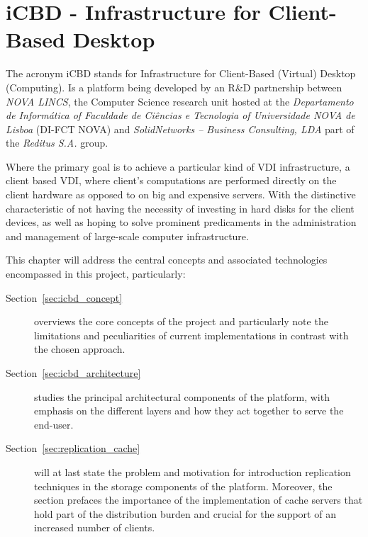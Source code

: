 

\chapter{iCBD - Infrastructure for Client-Based Desktop}
\label{cha:icbd}

The acronym \gls{iCBD} stands for Infrastructure for Client-Based (Virtual) Desktop (Computing). Is a platform being developed by an R\&D partnership between \textit{NOVA LINCS}, the Computer Science research unit hosted at the \textit{Departamento de Informática of Faculdade de Ciências e Tecnologia of Universidade NOVA de Lisboa} (DI-FCT NOVA) and \textit{SolidNetworks – Business Consulting, LDA} part of the \textit{Reditus S.A.} group. 

Where the primary goal is to achieve a particular kind of \gls{VDI} infrastructure, a client based VDI, where client's computations are performed directly on the client hardware as opposed to on big and expensive servers. With the distinctive characteristic of not having the necessity of investing in hard disks for the client devices, as well as hoping to solve prominent predicaments in the administration and management of large-scale computer infrastructure.

This chapter will address the central concepts and associated technologies encompassed in this project, particularly:\\

\begin{description}
	\item [Section~\ref{sec:icbd_concept}] overviews the core concepts of the project and particularly note the limitations and peculiarities of current implementations in contrast with the chosen approach.
	\item [Section~\ref{sec:icbd_architecture}] studies the principal architectural components of the platform, with emphasis on the different layers and how  they act together to serve the end-user.
	\item [Section~\ref{sec:replication_cache}] will at last state the problem and motivation for introduction replication techniques in the storage components of the platform. Moreover, the section prefaces the importance of the implementation of cache servers that hold part of the distribution burden and crucial for the support of an increased number of clients.
\end{description}


